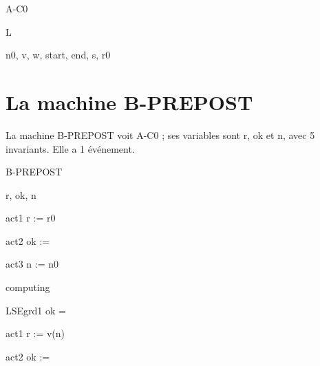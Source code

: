 \documentclass[11pt,a4paper]{article}
\begin{document}
\begin{context}{A-C0}
  \begin{sets}{L}
  \end{sets}
  \begin{constants}{n0, v, w, start, end, s, r0}
     
  \end{constants}
\end{context}

\section{La machine B-PREPOST}

La machine \textsf{B-PREPOST} voit \textsf{A-C0} ; ses variables sont \textsf{r}, \textsf{ok} et \textsf{n}, avec 5 invariants. Elle a 1 événement.

\begin{machine}{B-PREPOST}
  \begin{variables}{r, ok, n}
  \end{variables}
  \begin{initialisation}
    \begin{action}{act1} r := r0 \end{action}
    \begin{action}{act2} ok := \False \end{action}
    \begin{action}{act3} n := n0 \end{action}
  \end{initialisation}
  \begin{event}{computing}
    \begin{guard}{LSEgrd1} ok = \False \end{guard}
    \begin{action}{act1} r := v(n) \end{action} 
    \begin{action}{act2} ok := \True \end{action}
  \end{event}
\end{machine}
\end{document}
